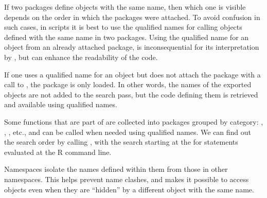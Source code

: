 \documentclass[krantz2]{krantz}\usepackage{knitr}
\begin{document}
If two packages define objects with the same name, then which one is visible depends on the order in which the packages were attached. To avoid confusion in such cases, in scripts it is best to use the qualified names for calling objects defined with the same name in two packages. Using the qualified name for an object from an already attached package, is inconsequential for its interpretation by \Rpgrm, but can enhance the readability of the code.

\begin{warningbox}
If one uses a qualified name for an object but does not attach the package with a call to , the package is only loaded. In other words, the names of the exported objects are not added to the search pass, but the code defining them is retrieved and available using qualified names.
\end{warningbox}

Some functions that are part of \Rlang are collected into packages grouped by category: , , , etc., and can be called when needed using qualified names.  We can find out the search order by calling , with the search starting at the  for statements evaluated at the R command line.

\begin{playground}
Namespaces isolate the names defined within them from those in other namespaces. This helps prevent name clashes, and makes it possible to access objects even when they are ``hidden'' by a different object with the same name.

\begin{knitrout}\footnotesize
{}\color{fgcolor}\begin{kframe}
\begin{alltt}
 \hlstd{)}
\hlstd{(}\hlstd{)}\hlopt{$} 
 \hlkwb{<-} \hlopt{:}
 \hlstd{)} 
 
 \hlstd{)}
\hlstd{(}\hlstd{)}\hlopt{$} 
\end{alltt}
\end{kframe}
\end{knitrout}
\end{playground}
\end{document}
